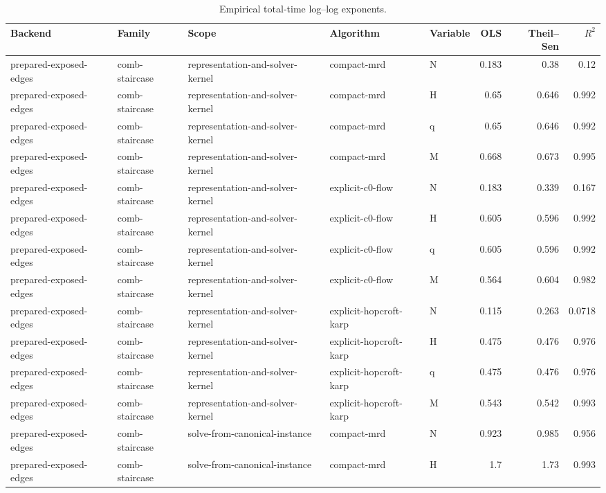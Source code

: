 \begin{table}[t]
\caption{Empirical total-time log--log exponents.}
\label{tab:kernel-exponents}
\begin{tabular}{lllllrrr}
\toprule
Backend & Family & Scope & Algorithm & Variable & OLS & Theil--Sen & $R^2$ \\
\midrule
prepared-exposed-edges & comb-staircase & representation-and-solver-kernel & compact-mrd & N & 0.183 & 0.38 & 0.12 \\
prepared-exposed-edges & comb-staircase & representation-and-solver-kernel & compact-mrd & H & 0.65 & 0.646 & 0.992 \\
prepared-exposed-edges & comb-staircase & representation-and-solver-kernel & compact-mrd & q & 0.65 & 0.646 & 0.992 \\
prepared-exposed-edges & comb-staircase & representation-and-solver-kernel & compact-mrd & M & 0.668 & 0.673 & 0.995 \\
prepared-exposed-edges & comb-staircase & representation-and-solver-kernel & explicit-c0-flow & N & 0.183 & 0.339 & 0.167 \\
prepared-exposed-edges & comb-staircase & representation-and-solver-kernel & explicit-c0-flow & H & 0.605 & 0.596 & 0.992 \\
prepared-exposed-edges & comb-staircase & representation-and-solver-kernel & explicit-c0-flow & q & 0.605 & 0.596 & 0.992 \\
prepared-exposed-edges & comb-staircase & representation-and-solver-kernel & explicit-c0-flow & M & 0.564 & 0.604 & 0.982 \\
prepared-exposed-edges & comb-staircase & representation-and-solver-kernel & explicit-hopcroft-karp & N & 0.115 & 0.263 & 0.0718 \\
prepared-exposed-edges & comb-staircase & representation-and-solver-kernel & explicit-hopcroft-karp & H & 0.475 & 0.476 & 0.976 \\
prepared-exposed-edges & comb-staircase & representation-and-solver-kernel & explicit-hopcroft-karp & q & 0.475 & 0.476 & 0.976 \\
prepared-exposed-edges & comb-staircase & representation-and-solver-kernel & explicit-hopcroft-karp & M & 0.543 & 0.542 & 0.993 \\
prepared-exposed-edges & comb-staircase & solve-from-canonical-instance & compact-mrd & N & 0.923 & 0.985 & 0.956 \\
prepared-exposed-edges & comb-staircase & solve-from-canonical-instance & compact-mrd & H & 1.7 & 1.73 & 0.993 \\

\end{tabular}
\end{table}
